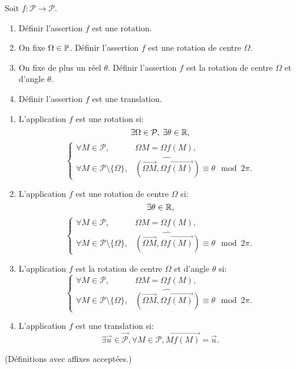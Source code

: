 \begin{exo}
Soit $f : \mathcal P\to \mathcal P$.
\begin{enumerate}
\item Définir l'assertion \og $f$ est une rotation\fg.
\item On fixe $\Omega\in \P$. Définir l'assertion \og $f$ est une rotation de centre $\Omega$\fg.
\item On fixe de plus un réel $\theta$. Définir l'assertion \og $f$ est la rotation de centre $\Omega$ et d'angle $\theta$\fg.
\item Définir l'assertion \og $f$ est une translation\fg.
\end{enumerate}
\begin{sol}
\begin{enumerate}
\item L'application $f$ est une rotation si:
\[ \exists\Omega\in\mathcal P, \:\exists \theta\in\R,\]
\[ 
\begin{cases}
\forall M\in\mathcal P, & \Omega M = \Omega f(M),\\
\forall M\in\mathcal P\setminus \{\Omega \}, & \widehat{(\overrightarrow{\Omega M},\overrightarrow{\Omega f(M)})}\equiv \theta \mod 2\pi.
\end{cases}
\]

\item L'application $f$ est une rotation de centre $\Omega$ si:
\[ \exists \theta\in\R,\]
\[ 
\begin{cases}
\forall M\in\mathcal P, & \Omega M = \Omega f(M),\\
\forall M\in\mathcal P\setminus \{\Omega \}, & \widehat{(\overrightarrow{\Omega M},\overrightarrow{\Omega f(M)})}\equiv \theta \mod 2\pi.
\end{cases}
\]
\item L'application $f$ est la rotation de centre $\Omega$ et d'angle $\theta$ si:
\[ 
\begin{cases}
\forall M\in\mathcal P, & \Omega M = \Omega f(M),\\
\forall M\in\mathcal P\setminus \{\Omega \}, & \widehat{(\overrightarrow{\Omega M},\overrightarrow{\Omega f(M)})}\equiv \theta \mod 2\pi.
\end{cases}
\]
\item L'application $f$ est une translation si:
\[ \exists \vec u \in \overrightarrow{\mathcal P}, \forall M\in\mathcal P, \overrightarrow{Mf(M)} = \vec u.\]
\end{enumerate}
(Définitions avec affixes acceptées.)
\end{sol}
\end{exo}



